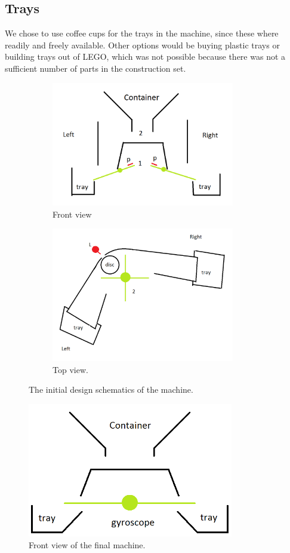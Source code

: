 \documentclass[a4paper,oneside,11pt]{article}
\begin{document}
\subsection{Trays}
We chose to use coffee cups for the trays in the machine, since these where readily and freely available. Other options would be buying plastic trays or building trays out of LEGO, which was not possible because there was not a sufficient number of parts in the construction set.

\begin{figure}[H]
\begin{subfigure}{0.5\textwidth}
	\centering
	\includegraphics[width=80mm]{front.png}
	\caption{\label{firstfront}Front view}	
\end{subfigure}	
\begin{subfigure}{0.5\textwidth}
\centering
	\includegraphics[width=80mm]{top.png}
	\caption{\label{top}Top view.}
\end{subfigure}	
\caption{The initial design schematics of the machine.}
\end{figure}

\begin{figure}[H]
	\centering
	\includegraphics[width=90mm]{frontnew.png}
	\caption{\label{front}Front view of the final machine.}
\end{figure}
\end{document}
